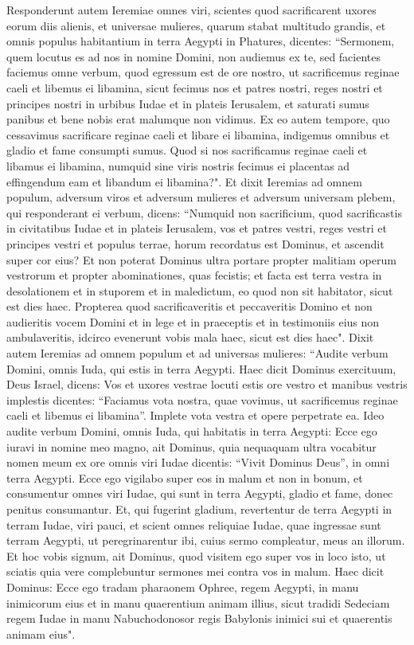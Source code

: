 \begin{biblechapter}
\verse Responderunt autem Ieremiae omnes viri, scientes quod sacrificarent uxores eorum diis alienis, et universae mulieres, quarum stabat multitudo grandis, et omnis populus habitantium in terra Aegypti in Phatures, dicentes: 
\verse “Sermonem, quem locutus es ad nos in nomine Domini, non audiemus ex te, 
\verse sed facientes faciemus omne verbum, quod egressum est de ore nostro, ut sacrificemus reginae caeli et libemus ei libamina, sicut fecimus nos et patres nostri, reges nostri et principes nostri in urbibus Iudae et in plateis Ierusalem, et saturati sumus panibus et bene nobis erat malumque non vidimus.  
\verse Ex eo autem tempore, quo cessavimus sacrificare reginae caeli et libare ei libamina, indigemus omnibus et gladio et fame consumpti sumus. 
\verse Quod si nos sacrificamus reginae caeli et libamus ei libamina, numquid sine viris nostris fecimus ei placentas ad effingendum eam et libandum ei libamina?". 
\verse Et dixit Ieremias ad omnem populum, adversum viros et adversum mulieres et adversum universam plebem, qui responderant ei verbum, dicens: 
\verse “Numquid non sacrificium, quod sacrificastis in civitatibus Iudae et in plateis Ierusalem, vos et patres vestri, reges vestri et principes vestri et populus terrae, horum recordatus est Dominus, et ascendit super cor eius? 
\verse Et non poterat Dominus ultra portare propter malitiam operum vestrorum et propter abominationes, quas fecistis; et facta est terra vestra in desolationem et in stuporem et in maledictum, eo quod non sit habitator, sicut est dies haec.  
\verse Propterea quod sacrificaveritis et peccaveritis Domino et non audieritis vocem Domini et in lege et in praeceptis et in testimoniis eius non ambulaveritis, idcirco evenerunt vobis mala haec, sicut est dies haec". 
\verse Dixit autem Ieremias ad omnem populum et ad universas mulieres: “Audite verbum Domini, omnis Iuda, qui estis in terra Aegypti. 
\verse Haec dicit Dominus exercituum, Deus Israel, dicens: Vos et uxores vestrae locuti estis ore vestro et manibus vestris implestis dicentes: “Faciamus vota nostra, quae vovimus, ut sacrificemus reginae caeli et libemus ei libamina”. Implete vota vestra et opere perpetrate ea. 
\verse Ideo audite verbum Domini, omnis Iuda, qui habitatis in terra Aegypti: Ecce ego iuravi in nomine meo magno, ait Dominus, quia nequaquam ultra vocabitur nomen meum ex ore omnis viri Iudae dicentis: “Vivit Dominus Deus”, in omni terra Aegypti. 
\verse Ecce ego vigilabo super eos in malum et non in bonum, et consumentur omnes viri Iudae, qui sunt in terra Aegypti, gladio et fame, donec penitus consumantur. 
\verse Et, qui fugerint gladium, revertentur de terra Aegypti in terram Iudae, viri pauci, et scient omnes reliquiae Iudae, quae ingressae sunt terram Aegypti, ut peregrinarentur ibi, cuius sermo compleatur, meus an illorum. 
\verse Et hoc vobis signum, ait Dominus, quod visitem ego super vos in loco isto, ut sciatis quia vere complebuntur sermones mei contra vos in malum. 
\verse Haec dicit Dominus: Ecce ego tradam pharaonem Ophree, regem Aegypti, in manu inimicorum eius et in manu quaerentium animam illius, sicut tradidi Sedeciam regem Iudae in manu Nabuchodonosor regis Babylonis inimici sui et quaerentis animam eius". 
\end{biblechapter}

